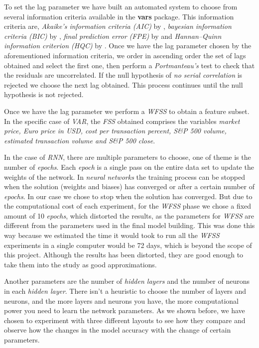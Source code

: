 To set the lag parameter we have built an automated system to choose
from several information criteria available in the \textbf{vars}
package. This information criteria are, \textit{Akaike's information
criteria (AIC)} by \cite{akaike1974new}, \textit{bayesian information
criteria (BIC)} by \cite{schwarz1978estimating}, \textit{final
prediction error (FPE)} by \cite{akaike1973infor} and
\textit{Hannan–Quinn information criterion (HQC)} by
\cite{hannan1979determination}. Once we have the lag parameter chosen
by the aforementioned information criteria, we order in ascending
order the set of lags obtained and select the first one, then perform
a \textit{Portmanteau's} test to check that the residuals are
uncorrelated. If the null hypothesis of \textit{no serial correlation}
is rejected we choose the next lag obtained. This process continues
until the null hypothesis is not rejected.

Once we have the lag parameter we perform a \textit{WFSS} to obtain a
feature subset. In the specific case of \textit{VAR}, the \textit{FSS}
obtained comprises the variables \textit{market price, Euro price in
USD, cost per transaction percent, S\&P 500 volume, estimated
transaction volume and S\&P 500 close}.

In the case of \textit{RNN}, there are multiple parameters to choose,
one of theme is the number of \textit{epochs}. Each \textit{epoch} is
a single pass on the entire data set to update the weights of the
network. In \textit{neural networks} the training process can be
stopped when the solution (weights and biases) has converged or after
a certain number of \textit{epochs}. In our case we chose to stop when
the solution has converged. But due to the computational cost of each
experiment, for the \textit{WFSS} phase we chose a fixed amount of 10
\textit{epochs}, which distorted the results, as the parameters for
\textit{WFSS} are different from the parameters used in the final
model building. This was done this way because we estimated the time
it would took to run all the \textit{WFSS} experiments in a single
computer would be 72 days, which is beyond the scope of this project.
Although the results has been distorted, they are good enough to take
them into the study as good approximations.

Another parameters are the number of \textit{hidden layers} and the
number of neurons in each \textit{hidden layer}. There isn't a
heuristic to choose the number of layers and neurons, and the more
layers and neurons you have, the more computational power you need to
learn the network parameters. As we shown before, we have chosen to
experiment with three different layouts to see how they compare and
observe how the changes in the model accuracy with the change of
certain parameters.

